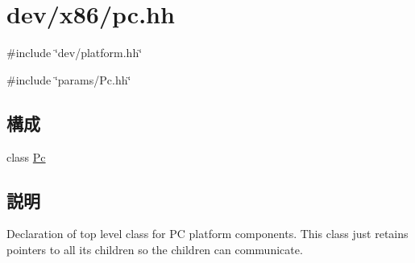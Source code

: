 \hypertarget{pc_8hh}{
\section{dev/x86/pc.hh}
\label{pc_8hh}
}
{\ttfamily \#include \char`\"{}dev/platform.hh\char`\"{}}\par
{\ttfamily \#include \char`\"{}params/Pc.hh\char`\"{}}\par
\subsection*{構成}
\begin{DoxyCompactItemize}
\item 
class \hyperlink{classPc}{Pc}
\end{DoxyCompactItemize}


\subsection{説明}
Declaration of top level class for PC platform components. This class just retains pointers to all its children so the children can communicate. 